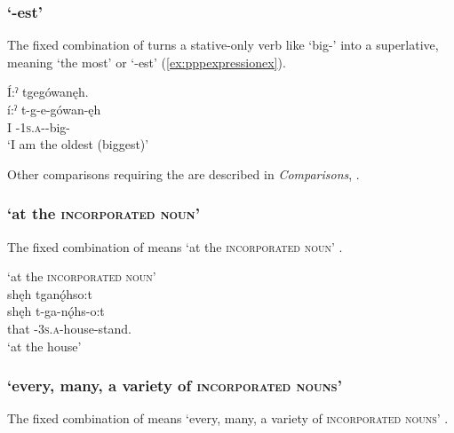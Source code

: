 \subsubsection*{ ‘-est’} \label{[d+pronominal prefix-stative.verb]}
The fixed combination of  turns a stative-only verb like  ‘big-{\stative}’ into a superlative, meaning ‘the most’ or ‘-est’ (\ref{ex:pppexpressionex}).

\ea\label{ex:pppexpressionex} Í:ˀ tgegówanęh. \\
\gll í:ˀ t-g-e-gówan-ęh\\
I {\cislocative}-\textsc{1s.a}-{\joinerE}-big-{\stative}\\
\glt ‘I am the oldest (biggest)’ 
\z

Other comparisons requiring the  {\cislocative} are described in \textit{Comparisons}, .


\subsubsection*{ ‘at the \textsc{incorporated noun}’} \label{[shęh d-pronominal prefix-incorporated noun-o:t]}
The fixed combination of  means ‘at the \textsc{incorporated noun}’ . 

\ea\label{ex:pppexpressionex13}  ‘at the \textsc{incorporated noun}’\\
shęh tganǫ́hso:t\\
\gll shęh t-ga-nǫ́hs-o:t\\
that {\cislocative}-\textsc{3s.a}-house-stand.{\stative}\\
\glt `at the house'
\z


\subsubsection*{ ‘every, many, a variety of \textsc{incorporated nouns}’} \label{[haˀde-pronominal prefix-incorporated noun-age:]}
The fixed combination of  means ‘every, many, a variety of \textsc{incorporated nouns}’ .

